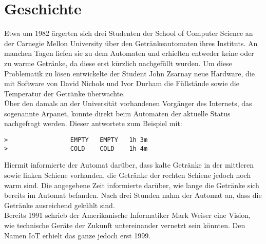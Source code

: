 \section{Geschichte}\label{s:gechichte}

Etwa um 1982 ärgerten sich drei Studenten der School of Computer Science an der Carnegie Mellon University über den Getränkeautomaten ihres Instituts. An manchen Tagen liefen sie zu dem Automaten und erhielten entweder keine oder zu warme Getränke, da diese erst kürzlich nachgefüllt wurden. Um diese Problematik zu lösen entwickelte der Student John Zsarnay neue Hardware, die mit Software von David Nichols und Ivor Durham die Füllstände sowie die Temperatur der Getränke überwachte\cite{ws:cmu}.\\
Über den damals an der Universität vorhandenen Vorgänger des Internets, das sogenannte Arpanet, konnte direkt beim Automaten der aktuelle Status nachgefragt werden. Dieser antwortete zum Beispiel mit:\\

\begin{lstlisting}[frame=single] 
>                 EMPTY   EMPTY   1h 3m
>                 COLD    COLD    1h 4m
\end{lstlisting}

Hiermit informierte der Automat darüber, dass kalte Getränke in der mittleren sowie linken Schiene vorhanden, die Getränke der rechten Schiene jedoch noch warm sind. Die angegebene Zeit informierte darüber, wie lange die Getränke sich bereits im Automat befanden. Nach drei Stunden nahm der Automat an, dass die Getränke ausreichend gekühlt sind.\\

Bereits 1991 schrieb der Amerikanische Informatiker Mark Weiser eine Vision, wie technische Geräte der Zukunft untereinander vernetzt sein könnten\cite{ws:weiser}. 
Den Namen \ac{IoT} erhielt das ganze jedoch erst 1999.
